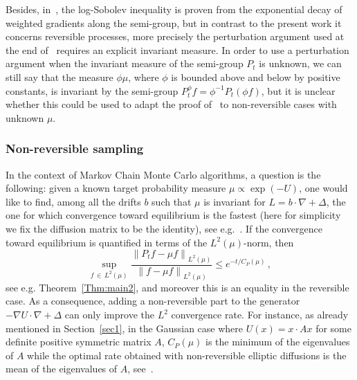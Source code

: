 \documentclass[AHL,Unicode,longabstracts,published]{cedram}
\newcommand{\na}{\nabla}
\newcommand{\1}{\mathbbm{1}}
\newcommand{\nv}[1]{#1}
\begin{document}
Besides, in~\cite[Corollary~1.3]{Wang3}, the log-Sobolev inequality is proven from the exponential decay of weighted gradients along the semi-group, but in contrast to the present work it concerns reversible processes, more precisely the perturbation argument used at the end of~\cite[Corollary~1.3]{Wang3} requires an explicit invariant measure. In order to use a perturbation argument when the invariant measure of the semi-group $P_t$ is unknown, we can still say that the measure $\phi\mu$, where $\phi$ is bounded above and below by positive constants, is invariant by the semi-group $P_t^\phi f= \phi^{-1} P_t(\phi f)$, but it is unclear whether this could be used to adapt the proof of~\cite{Wang3} to non-reversible cases with unknown $\mu$.

\subsubsection*{Non-reversible sampling}

In the context of Markov Chain Monte Carlo algorithms, a question is the following: given a known target probability measure $\mu\propto \exp(-U)$, one would like to find, among all the drifts $b$ such that $\mu$ is invariant for $L= b\cdot \na + \Delta$, the one for which convergence toward equilibrium is the fastest (here for simplicity we fix the diffusion matrix to be the identity), see e.g.~\cite{HHS1,HHS2,Lelievre2012,MonmarcheGuillinOU}. If the convergence toward equilibrium is quantified in term\nv{s} of the $L^2(\mu)$-norm, then
\[
\sup_{f\,\in\,L^2(\mu)} \frac{\left\|P_t f - \mu f\right\|_{L^2(\mu)}}{\left\|\nv{ f} - \mu f\right\|_{L^2(\mu)}} \leqslant e^{-t/C_P(\mu)}\,,
\]
see e.g. Theorem~\ref{Thm:main2}, and moreover this is an equality in the reversible case. As a consequence, adding a non-reversible part to the generator $-\na U \cdot\na + \Delta$ can only improve the $L^2$ convergence rate. For instance, \nv{as already mentioned in Section~\ref{sec1},} in the Gaussian case where $U(x) = x\cdot A x$ for some definite positive symmetric matrix $A$, $C_P(\mu)$ is the minimum of the eigenvalues of $A$ while the optimal rate obtained with non-reversible elliptic diffusions is the mean of the eigenvalues of $A$, see~\cite{Lelievre2012}.
\end{document}
